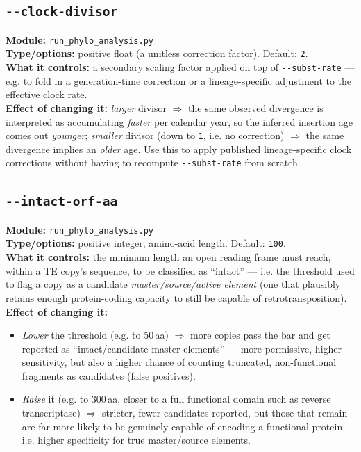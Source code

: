 \documentclass[11pt]{article}
\newcommand{\flag}[1]{\texttt{-\/-#1}}
\newcommand{\param}[1]{\subsection*{\texttt{-\/-#1}}}
\begin{document}
\param{clock-divisor}
\textbf{Module:} \texttt{run\_phylo\_analysis.py}\\
\textbf{Type/options:} positive float (a unitless correction factor). Default:
\texttt{2}.\\
\textbf{What it controls:} a secondary scaling factor applied on top of
\flag{subst-rate} — e.g. to fold in a generation-time correction or a
lineage-specific adjustment to the effective clock rate.\\
\textbf{Effect of changing it:} \emph{larger} divisor $\Rightarrow$ the same observed
divergence is interpreted as accumulating \emph{faster} per calendar year, so the
inferred insertion age comes out \emph{younger}; \emph{smaller} divisor (down to
\texttt{1}, i.e. no correction) $\Rightarrow$ the same divergence implies an
\emph{older} age. Use this to apply published lineage-specific clock corrections without
having to recompute \flag{subst-rate} from scratch.

\param{intact-orf-aa}
\textbf{Module:} \texttt{run\_phylo\_analysis.py}\\
\textbf{Type/options:} positive integer, amino-acid length. Default: \texttt{100}.\\
\textbf{What it controls:} the minimum length an open reading frame must reach, within
a TE copy's sequence, to be classified as ``intact'' — i.e. the threshold used to flag
a copy as a candidate \emph{master/source/active element} (one that plausibly retains
enough protein-coding capacity to still be capable of retrotransposition).\\
\textbf{Effect of changing it:}
\begin{itemize}[leftmargin=1.4em,topsep=2pt,itemsep=2pt]
  \item \emph{Lower} the threshold (e.g. to 50\,aa) $\Rightarrow$ more copies pass the
    bar and get reported as ``intact/candidate master elements'' — more permissive,
    higher sensitivity, but also a higher chance of counting truncated, non-functional
    fragments as candidates (false positives).
  \item \emph{Raise} it (e.g. to 300\,aa, closer to a full functional domain such as
    reverse transcriptase) $\Rightarrow$ stricter, fewer candidates reported, but those
    that remain are far more likely to be genuinely capable of encoding a functional
    protein — i.e. higher specificity for true master/source elements.
\end{itemize}
\end{document}
